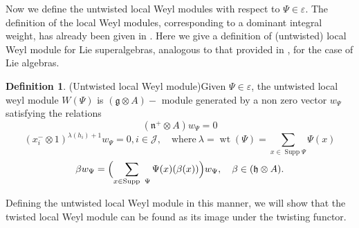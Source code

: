 \documentclass[11pt]{amsart}
\theoremstyle{plain}
\theoremstyle{definition}
\newtheorem{defn}[thm]{Definition}
\newcommand{\g}{\mathfrak{g}}
\newcommand{\h}{\mathfrak{h}}
\newcommand{\n}{\mathfrak{n}}
\DeclareMathOperator{\Supp}{Supp}
\DeclareMathOperator{\wt}{wt}
\begin{document}
Now we define the untwisted local Weyl modules with respect to $\Psi\in\varepsilon$. The definition of the local Weyl modules, corresponding to a dominant integral weight, has already been given in \cite{BCM19}. Here we give a definition of (untwisted) local Weyl module for Lie superalgebras, analogous to that provided in \cite{FKKS12}, for the case of Lie algebras. 
\begin{defn}(Untwisted local Weyl module)\label{def:1}
Given $\Psi\in\varepsilon$, the untwisted local weyl module $W(\Psi)$ is $(\g\otimes A)-$ module generated by a non zero vector $w_{\Psi}$ satisfying the relations
\begin{equation*}
        (\n^{+}\otimes A) w_{\Psi}=0
    \end{equation*}
\begin{equation}\label{eq:6}
        (x_{i}^{-}\otimes 1)^{\lambda(h_{i})+1} w_\Psi=0, i\in \mathcal{J},\quad \mbox{where}~\lambda=\wt(\Psi)=\sum_{x\in \Supp\Psi}\Psi(x)
    \end{equation}
\begin{equation*}
        \beta w_{\Psi}=\Bigl(\sum_{x\in \Supp\ \Psi}\Psi(x)(\beta(x))\Bigl)w_{\Psi}, \quad \beta\in(\h\otimes A).
    \end{equation*}
\end{defn}
Defining the untwisted local Weyl module in this manner, we will show that the twisted local Weyl module can be found as its image under the twisting functor.
\end{document}
